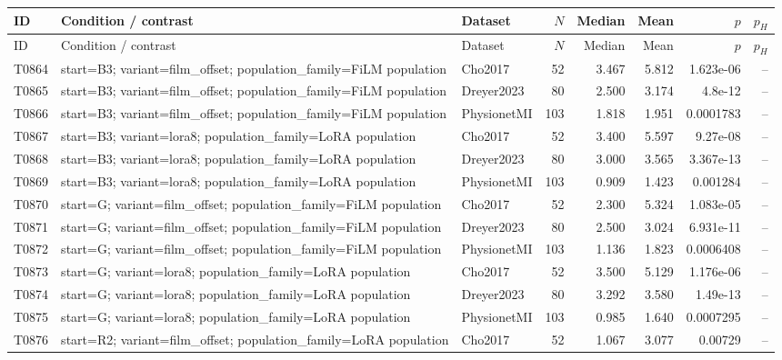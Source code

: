 \begin{longtable}{p{.45in}p{2.6in}p{.75in}rrrrr}
\toprule
ID & Condition / contrast & Dataset & $N$ & Median & Mean & $p$ & $p_H$ \\
\midrule
\endfirsthead
\toprule
ID & Condition / contrast & Dataset & $N$ & Median & Mean & $p$ & $p_H$ \\
\midrule
\endhead
T0864 & start=B3; variant=film\_\allowbreak{}offset; population\_\allowbreak{}family=FiLM population & Cho2017 & 52 & 3.467 & 5.812 & 1.623e-06 & -- \\
T0865 & start=B3; variant=film\_\allowbreak{}offset; population\_\allowbreak{}family=FiLM population & Dreyer2023 & 80 & 2.500 & 3.174 & 4.8e-12 & -- \\
T0866 & start=B3; variant=film\_\allowbreak{}offset; population\_\allowbreak{}family=FiLM population & PhysionetMI & 103 & 1.818 & 1.951 & 0.0001783 & -- \\
T0867 & start=B3; variant=lora8; population\_\allowbreak{}family=LoRA population & Cho2017 & 52 & 3.400 & 5.597 & 9.27e-08 & -- \\
T0868 & start=B3; variant=lora8; population\_\allowbreak{}family=LoRA population & Dreyer2023 & 80 & 3.000 & 3.565 & 3.367e-13 & -- \\
T0869 & start=B3; variant=lora8; population\_\allowbreak{}family=LoRA population & PhysionetMI & 103 & 0.909 & 1.423 & 0.001284 & -- \\
T0870 & start=G; variant=film\_\allowbreak{}offset; population\_\allowbreak{}family=FiLM population & Cho2017 & 52 & 2.300 & 5.324 & 1.083e-05 & -- \\
T0871 & start=G; variant=film\_\allowbreak{}offset; population\_\allowbreak{}family=FiLM population & Dreyer2023 & 80 & 2.500 & 3.024 & 6.931e-11 & -- \\
T0872 & start=G; variant=film\_\allowbreak{}offset; population\_\allowbreak{}family=FiLM population & PhysionetMI & 103 & 1.136 & 1.823 & 0.0006408 & -- \\
T0873 & start=G; variant=lora8; population\_\allowbreak{}family=LoRA population & Cho2017 & 52 & 3.500 & 5.129 & 1.176e-06 & -- \\
T0874 & start=G; variant=lora8; population\_\allowbreak{}family=LoRA population & Dreyer2023 & 80 & 3.292 & 3.580 & 1.49e-13 & -- \\
T0875 & start=G; variant=lora8; population\_\allowbreak{}family=LoRA population & PhysionetMI & 103 & 0.985 & 1.640 & 0.0007295 & -- \\
T0876 & start=R2; variant=film\_\allowbreak{}offset; population\_\allowbreak{}family=LoRA population & Cho2017 & 52 & 1.067 & 3.077 & 0.00729 & -- \\

\end{longtable}
